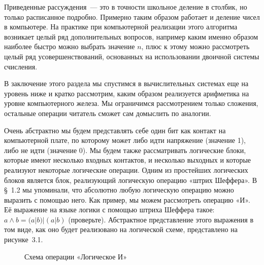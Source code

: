 Приведенные рассуждения~— это в точности школьное деление в столбик, но только расписанное подробно. Примерно таким образом работает и деление чисел в компьютере. На практике при компьютерной реализации этого алгоритма возникает целый ряд дополнительных вопросов, например каким именно образом наиболее быстро можно выбрать значение $n$, плюс к этому можно рассмотреть целый ряд усовершенствований, основанных на использовании двоичной системы счисления.

В заключение этого раздела мы спустимся в вычислительных системах еще на уровень ниже и кратко рассмотрим, каким образом реализуется арифметика на уровне компьютерного железа. Мы ограничимся рассмотрением только сложения, остальные операции читатель сможет сам домыслить по аналогии.

Очень абстрактно мы будем представлять себе один бит как контакт на компьютерной плате, по которому может либо идти напряжение (значение 1), либо не идти (значение 0). Мы будем также рассматривать логические блоки, которые имеют несколько входных контактов, и несколько выходных и которые реализуют некоторые логические операции. Одним из простейших логических блоков является блок, реализующий логическую операцию «штрих Шеффера». В \S~1.2 мы упоминали, что абсолютно любую логическую операцию можно выразить с помощью него. Как пример, мы можем рассмотреть операцию «И». Её выражение на языке логики с помощью штриха Шеффера такое: $a\land b = (a|b)|(a|b)$ (проверьте). Абстрактное представление этого выражения в том виде, как оно будет реализовано на логической схеме, представлено на рисунке~3.1.
\begin{figure}[h]
\centering
{}
\caption{Схема операции «Логическое И»}
\end{figure}

